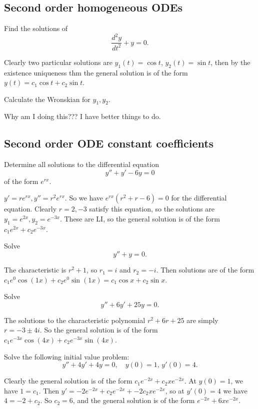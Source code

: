 \subsection{Second order homogeneous ODEs}
\begin{prob}
    Find the solutions of \[
   \frac{d^2y}{dt^2}+y=0.
    \] 
\end{prob}
\begin{solution}
    Clearly two particular solutions are $y_1(t)=\cos t$, $y_2(t)=\sin t$, then by the existence uniqueness thm the general solution is of the form $y(t)=c_1 \cos t+c_2 \sin t$.
\end{solution}
\begin{prob}
    Calculate the Wronskian for $y_1,y_2$.
\end{prob}
\begin{solution}
    Why am I doing this??? I have better things to do.
\end{solution}
\subsection{Second order ODE constant coefficients}
\begin{prob}
    Determine all solutions to the differential equation \[
    y''+y'-6y=0
    \] of the form $e^{rx}$.
\end{prob}
\begin{solution}
    $y'=re^{rx},y''=r^2e^{rx}$. So we have $e^{rx}(r^2+r-6)=0$ for the differential equation. Clearly $r=2,-3$ satisfy this equation, so the solutions are $y_1=e^{2x},y_2=e^{-3x}$. These are LI, so the general solution is of the form $c_1e^{2x}+c_2e^{-3x}$.
\end{solution}
\begin{prob}
    Solve \[
    y''+y=0.
    \] 
\end{prob}
\begin{solution}
    The characteristic is $r^2+1$, so $r_1=i$ and $r_2=-i$. Then solutions are of the form $c_1e^{0}\cos(1x)+c_2e^{0}\sin(1x)=c_1\cos x+c_2 \sin x$.
\end{solution}
\begin{prob}
    Solve \[
    y''+6y'+25y=0.
    \] 
\end{prob}
\begin{solution}
    The solutions to the characteristic polynomial $r^2+6r+25$ are simply $r=-3\pm 4i$. So the general solution is of the form $c_1e^{-3x}\cos(4x)+c_2e^{-3x}\sin(4x)$.
\end{solution}
\begin{prob}
    Solve the following initial value problem: \[
        y''+4y'+4y=0,\quad y(0)=1,\,y'(0)=4.
    \] 
\end{prob}
\begin{solution}
    Clearly the general solution is of the form $c_1e^{-2x}+c_2xe^{-2x}$. At $y(0)=1$, we have $1=c_1$. Then $y'=-2e^{-2x}+c_2e^{-2x}+-2c_2xe^{-2x}$, so at $y'(0)=4$ we have $4=-2+c_2$. So $c_2=6$, and the general solution is of the form $e^{-2x}+6xe^{-2x}$.
\end{solution}
